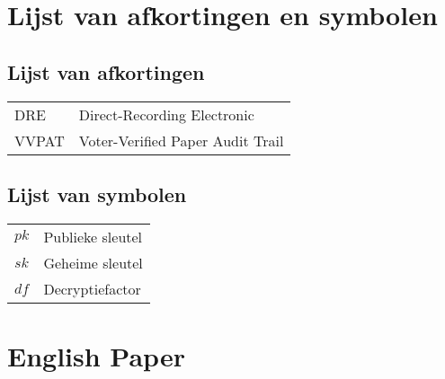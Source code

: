 \documentclass[master=elt,masteroption=im,inputenc=utf8]{kulemt}
\begin{document}
  

  \begin{preface}
    
  \end{preface}

  \kulemtmanToC
  \tableofcontents

  \begin{abstract}
    
  \end{abstract}
  
  \listoffiguresandtables
  
  \chapter{Lijst van afkortingen en symbolen}
  \section*{Lijst van afkortingen}
  \begin{flushleft}
    \renewcommand{\arraystretch}{1.1}
    \begin{tabularx}{\textwidth}{@{}p{12mm}X@{}}
      DRE & Direct-Recording Electronic \\
      VVPAT & Voter-Verified Paper Audit Trail
    \end{tabularx}
  \end{flushleft}
  \section*{Lijst van symbolen}
  \begin{flushleft}
    \renewcommand{\arraystretch}{1.1}
    \begin{tabularx}{\textwidth}{@{}p{12mm}X@{}}
      $pk$ & Publieke sleutel \\
      $sk$ & Geheime sleutel \\
      $df$ & Decryptiefactor
    \end{tabularx}
  \end{flushleft}

  \mainmatter

  
  
  
  
  
  
  
  
  
  
  

  \appendix
  
  \chapter{English Paper}
  

  \backmatter

  \nocite{*}

  
  
\end{document}
